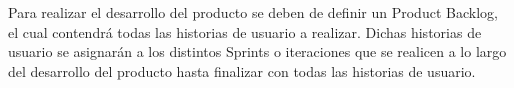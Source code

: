 Para realizar el desarrollo del producto se deben de definir un Product Backlog, el cual contendrá todas las historias de usuario a realizar. Dichas historias de usuario se asignarán a los distintos Sprints o iteraciones que se realicen a lo largo del desarrollo del producto hasta finalizar con todas las historias de usuario. 










